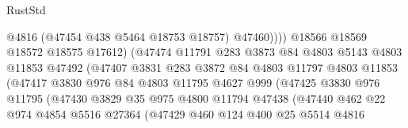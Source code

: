 \begin{lexlean}{RustStd}
\begin{coremodule}
                                        @4816
                                        (@47454 @438 @5464 @18753 @18757)
                                        @47460))))
                                @18566
                                @18569
                                @18572
                                @18575
                                @17612)
                              (@47474
                                @11791
                                @283
                                @3873
                                @84
                                @4803
                                @5143
                                @4803
                                @11853
                                @47492
                                (@47407
                                  @3831
                                  @283
                                  @3872
                                  @84
                                  @4803
                                  @11797
                                  @4803
                                  @11853
                                  (@47417
                                    @3830
                                    @976
                                    @84
                                    @4803
                                    @11795
                                    @4627
                                    @999
                                    (@47425
                                      @3830
                                      @976
                                      @11795
                                      (@47430
                                        @3829
                                        @35
                                        @975
                                        @4800
                                        @11794
                                        @47438
                                        (@47440
                                          @462
                                          @22
                                          @974
                                          @4854
                                          @5516
                                          @27364
                                          (@47429
                                            @460
                                            @124
                                            @400
                                            @25
                                            @5514
                                            @4816

\end{coremodule}
\end{lexlean}
